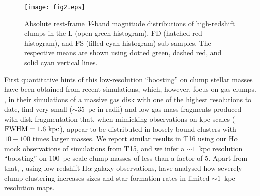 \documentclass[twocolumn]{aastex61}
\begin{document}
%

\begin{figure}
\centering
\texttt{[image: fig2.eps]}
\caption{Absolute rest-frame {\it V}-band magnitude distributions of high-redshift clumps in the L (open green histogram), FD (hatched red histogram), and FS (filled cyan histogram) sub-samples. The respective means are shown using dotted green, dashed red, and solid cyan vertical lines.} 
\label{fig:clump-Mag}
\end{figure}
%

First quantitative hints of this low-resolution ``boosting'' on clump stellar 
masses have been obtained from recent simulations, which, however, focus on gas 
clumps. \citet{behrendt16}, in their simulations of a massive gas disk with one 
of the highest resolutions to date, find very small ($\sim 35$~pc in radii) and 
low gas mass fragments produced 
with disk fragmentation
that, when mimicking observations on kpc-scales ($\rm FWHM=1.6~kpc$), appear to 
be distributed in loosely bound clusters 
with $10-100$ times larger masses.
We report similar results in T16 using our H$\alpha$ mock observations of 
simulations from T15, and we infer a $\sim 1$~kpc resolution ``boosting'' on 
100~pc-scale clump masses of less than a factor of 5.
Apart from that, \citet{fisher17},
using low-redshift H$\alpha$ galaxy observations, have analysed how severely 
clump clustering increases sizes and star formation rates in limited 
$\sim 1$~kpc resolution maps.
\end{document}
